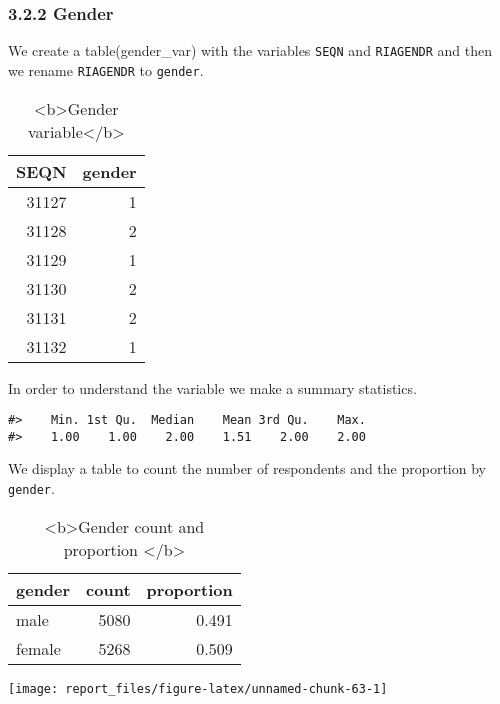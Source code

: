 \documentclass[
]{article}
\begin{document}
\hypertarget{gender}{%
\subsubsection{3.2.2 Gender}\label{gender}}

We create a table(gender\_var) with the variables \texttt{SEQN} and
\texttt{RIAGENDR} and then we rename \texttt{RIAGENDR} to
\texttt{gender}.

\begin{table}

\caption{\label{tab:unnamed-chunk-60}<b>Gender variable</b>}
\centering
\begin{tabular}[t]{r|r}
\hline
SEQN & gender\\
\hline
31127 & 1\\
\hline
31128 & 2\\
\hline
31129 & 1\\
\hline
31130 & 2\\
\hline
31131 & 2\\
\hline
31132 & 1\\
\hline
\end{tabular}
\end{table}

In order to understand the variable we make a summary statistics.

\begin{verbatim}
#>    Min. 1st Qu.  Median    Mean 3rd Qu.    Max. 
#>    1.00    1.00    2.00    1.51    2.00    2.00
\end{verbatim}

We display a table to count the number of respondents and the proportion
by \texttt{gender}.

\begin{table}

\caption{\label{tab:unnamed-chunk-63}<b>Gender count and proportion </b>}
\centering
\begin{tabular}[t]{l|r|r}
\hline
gender & count & proportion\\
\hline
male & 5080 & 0.491\\
\hline
female & 5268 & 0.509\\
\hline
\end{tabular}
\end{table}

\begin{center}\texttt{[image: report\_files/figure-latex/unnamed-chunk-63-1]} \end{center}
\end{document}
